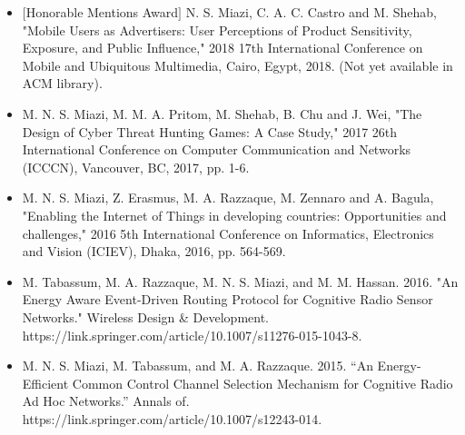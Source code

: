%
%
%


\begin{itemize}
	\item $[$Honorable Mentions Award$]$ N. S. Miazi, C. A. C. Castro and M. Shehab, "Mobile Users as Advertisers: User Perceptions of Product Sensitivity, Exposure, and Public Influence," 2018 17th International Conference on Mobile and Ubiquitous Multimedia, Cairo, Egypt, 2018. (Not yet available in ACM library).
	\item M. N. S. Miazi, M. M. A. Pritom, M. Shehab, B. Chu and J. Wei, "The Design of Cyber Threat Hunting Games: A Case Study," 2017 26th International Conference on Computer Communication and Networks (ICCCN), Vancouver, BC, 2017, pp. 1-6.
	\item M. N. S. Miazi, Z. Erasmus, M. A. Razzaque, M. Zennaro and A. Bagula, "Enabling the Internet of Things in developing countries: Opportunities and challenges," 2016 5th International Conference on Informatics, Electronics and Vision (ICIEV), Dhaka, 2016, pp. 564-569.
	\item M. Tabassum, M. A. Razzaque, M. N. S. Miazi, and M. M. Hassan. 2016. "An Energy Aware Event-Driven Routing Protocol for Cognitive Radio Sensor Networks." Wireless Design \& Development. https://link.springer.com/article/10.1007/s11276-015-1043-8.
	\item M. N. S. Miazi, M. Tabassum, and M. A. Razzaque. 2015. “An Energy-Efficient Common Control Channel Selection Mechanism for Cognitive Radio Ad Hoc Networks.” Annals of. https://link.springer.com/article/10.1007/s12243-014.
\end{itemize}